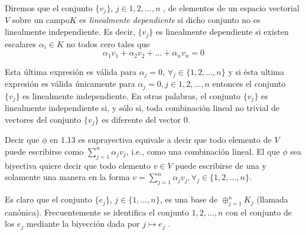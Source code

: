  			Diremos que el conjunto $ \{v_{j} \} $, $ j \in {1, 2, \ldots, n} $ , de elementos de un espacio vectorial $ V $ sobre un campo$  K $ es  \textit{linealmente dependiente}  si dicho conjunto no es linealmente independiente. Es decir, $ \{v_{j} \} $ es linealmente dependiente si existen escalares $ \alpha_{i} \in K $ no todos cero tales que
 			\[ \alpha_{1} v_{1} + \alpha_{2}v_{2} + \ldots + \alpha_{n} v_{n} = 0 \]
 			
 			Esta última expresión es válida para $ \alpha_{j} = 0 $, $ \forall_{j} \in \{1, 2, \ldots , n\} $ y si ésta ultima expresión es válida únicamente para $ \alpha_{j} = 0, j \in {1, 2, \ldots , n} $ entonces el conjunto $ \{v_{j} \} $ es linealmente independiente. En otras palabras, el conjunto $ \{v_{j} \} $ es linealmente independiente si, y sólo si, toda combinación lineal no trivial de vectores del conjunto $ \{v_{j} \} $ es diferente del vector 0.
 			
 			Decir que $\phi$ en 1.13 es suprayectiva equivale a decir que todo elemento de $ V $ puede escribirse como $ \sum_{j=1}^{n} \alpha_{j} v_{j} $, i.e., como una combinación lineal. El que $\phi$ sea biyectiva quiere decir que todo elemento $ v \in V $ puede escribirse de una y solamente una manera en la forma $ v = \sum_{j=1}^{n} \alpha_{j} v_{j}, \forall_{j} \in \{1,2, \ldots, n\}$.
 			
 			Es claro que el conjunto $ \{e_{j}\} $, $ j \in \{1, \ldots , n\} $, es una base de $ \oplus^{n}_{j=1} K_{j} $ (llamada
 			canónica). Frecuentemente se identifica el conjunto $ {1, 2, \ldots , n} $ con el conjunto de los $ e_{j} $ mediante la biyección dada por $  j \mapsto e_{j} $ .
 			

